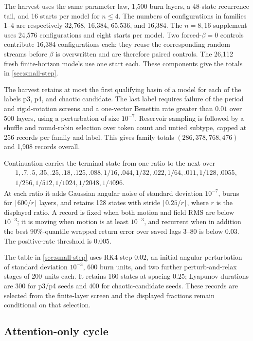 \documentclass[11pt,a4paper]{article}
\theoremstyle{definition}
\begin{document}
The harvest uses the same parameter law, 1,500 burn layers, a 48-state recurrence
tail, and 16 starts per model for $n\leq4$.  The numbers of configurations in families
1--4 are respectively 32,768, 16,384, 65,536, and 16,384.  The $n=8,16$ supplement
uses 24,576 configurations and eight starts per model.  Two forced-$\beta=0$
controls contribute 16,384 configurations each; they reuse the corresponding random
streams before $\beta$ is overwritten and are therefore paired controls.  The 26,112
fresh finite-horizon models use one start each.  These components give the totals in
\cref{sec:small-step}.

The harvest retains at most the first qualifying basin of a model for each of the
labels p3, p4, and chaotic candidate.  The last label requires failure of the period
and rigid-rotation screens and a one-vector Benettin rate greater than $0.01$ over 500
layers, using a perturbation of size $10^{-7}$.  Reservoir sampling is followed by a
shuffle and round-robin selection over token count and untied subtype, capped at 256
records per family and label.  This gives family totals $(286,378,768,476)$ and 1,908
records overall.

Continuation carries the terminal state from one ratio to the next over
\begin{multline*}
1,.7,.5,.35,.25,.18,.125,.088,1/16,.044,1/32,.022,1/64,.011,1/128,.0055,\\
1/256,1/512,1/1024,1/2048,1/4096.
\end{multline*}
At each ratio it adds Gaussian angular noise of standard deviation $10^{-7}$, burns
for $\lceil600/r\rceil$ layers, and retains 128 states with stride
$\lceil0.25/r\rceil$, where $r$ is the displayed ratio.  A record is
fixed when both motion and field RMS are below $10^{-3}$; it is moving when motion is
at least $10^{-3}$, and recurrent when in addition the best 90\%-quantile wrapped
return error over saved lags 3--80 is below $0.03$.  The positive-rate threshold is
$0.005$.

The table in \cref{sec:small-step} uses RK4 step $0.02$, an initial angular
perturbation of standard deviation $10^{-3}$, 600 burn units, and two further
perturb-and-relax stages of 200 units each.  It retains 160 states at spacing $0.25$;
Lyapunov durations are 300 for p3/p4 seeds and 400 for chaotic-candidate seeds.  These
records are selected from the finite-layer screen and the displayed fractions remain
conditional on that selection.

\subsection{Attention-only cycle}
\end{document}
